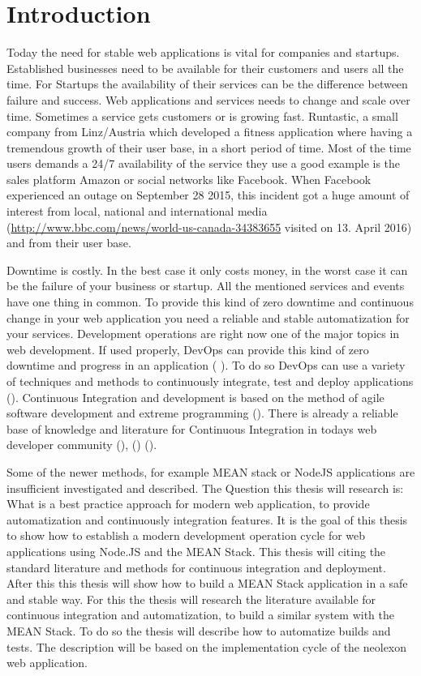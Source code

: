 \section{Introduction}
Today the need for stable web applications is vital for companies and startups. Established businesses need to be
available for their customers and users all the time. For Startups the availability of their services can be the difference
between failure and success. Web applications and services needs to change and scale over time. Sometimes a service gets customers or is
growing fast. Runtastic, a small company from Linz/Austria which developed a fitness application where having a tremendous growth of
their user base, in a short period of time. Most of the time users demands a 24/7 availability of the service they use a good example
is the sales platform Amazon or social networks like Facebook. When Facebook experienced an outage on September 28 2015, this incident
got a huge amount of interest from local, national and international media (\url{http://www.bbc.com/news/world-us-canada-34383655} visited on 13. April 2016)
and from their user base.

Downtime is costly. In the best case it only costs money, in the worst case
it can be the failure of your business or startup. All the mentioned services and events have one thing in common. To provide this kind of zero
downtime and continuous change in your web application you need a reliable and stable automatization for your services. Development operations are
right now one of the major topics in web development. If used properly, DevOps can provide this kind of zero downtime and progress in an application
(\cite{humble2010continuous} \cite{duvall2007continuous}). To do so DevOps can use a variety of techniques and methods to continuously
integrate, test and deploy applications (\cite{meyer2014continuous}).
Continuous Integration and development is based on the method of agile software development and extreme programming
(\cite{lindstrom2004extreme}). There is already a reliable base of knowledge and literature for Continuous Integration in todays web developer community
(\cite{schaefer2013continuous}), (\cite{fowler2006continuous}) (\cite{fowler2012continuous}).

Some of the newer methods, for example MEAN stack or NodeJS applications are insufficient investigated and described.
The Question this thesis will research is: What is a best practice approach for modern web application,
to provide automatization and continuously integration features. It is the goal of this thesis to show how to establish a modern development operation
cycle for web applications using Node.JS and the MEAN Stack.
This thesis will citing the standard literature and methods for continuous integration and deployment. After this this thesis will
show how to build a MEAN Stack application in a safe and stable way.
For this the thesis will research the literature available for continuous integration and automatization, to build a similar system with the MEAN Stack.
To do so the thesis will describe how to automatize builds and tests. The description will be based on the implementation cycle of the neolexon web application.

